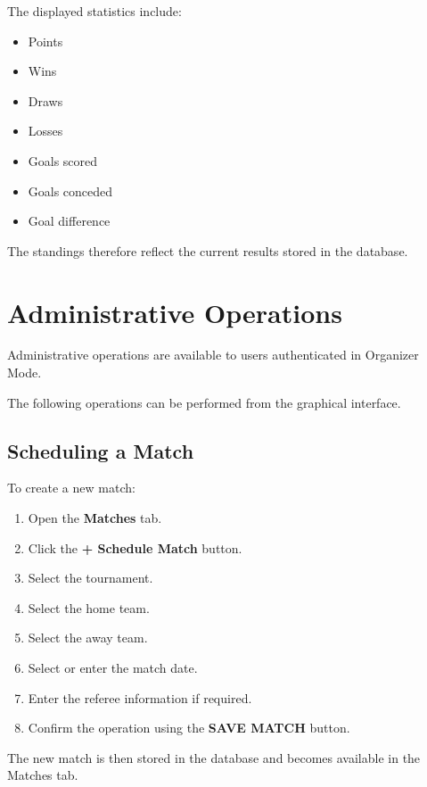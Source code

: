\documentclass[12pt,a4paper]{article}
\begin{document}
The displayed statistics include:

\begin{itemize}
\item Points
\item Wins
\item Draws
\item Losses
\item Goals scored
\item Goals conceded
\item Goal difference
\end{itemize}

The standings therefore reflect the current results stored in
the database.


\section{Administrative Operations}

Administrative operations are available to users authenticated
in Organizer Mode.

The following operations can be performed from the graphical
interface.

\subsection{Scheduling a Match}

To create a new match:

\begin{enumerate}
\item Open the \textbf{Matches} tab.
\item Click the \textbf{+ Schedule Match} button.
\item Select the tournament.
\item Select the home team.
\item Select the away team.
\item Select or enter the match date.
\item Enter the referee information if required.
\item Confirm the operation using the
\textbf{SAVE MATCH} button.
\end{enumerate}

The new match is then stored in the database and becomes
available in the Matches tab.
\end{document}
